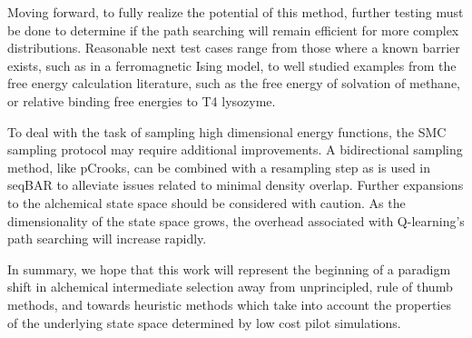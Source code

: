 Moving forward, to fully realize the potential of this method, further testing must be done to determine if the path searching will remain efficient for more complex distributions.
Reasonable next test cases range from those where a known barrier exists, such as in a ferromagnetic Ising model\cite{mora2012transition}, to well studied examples from the free energy calculation literature, such as the free energy of solvation of methane\cite{paliwal2011benchmark}, or relative binding free energies to T4 lysozyme\cite{boyce2009predicting}.

To deal with the task of sampling high dimensional energy functions, the SMC sampling protocol may require additional improvements. 
A bidirectional sampling method, like pCrooks, can be combined with a resampling step as is used in seqBAR to alleviate issues related to minimal density overlap.
Further expansions to the alchemical state space should be considered with caution. 
As the dimensionality of the state space grows, the overhead associated with Q-learning's path searching will increase rapidly.

In summary, we hope that this work will represent the beginning of a paradigm shift in alchemical intermediate selection away from unprincipled, rule of thumb methods, and towards heuristic methods which take into account the properties of the underlying state space determined by low cost pilot simulations.

